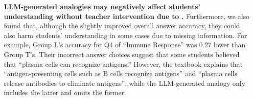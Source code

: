 \textbf{LLM-generated analogies may negatively affect students' understanding without teacher intervention due to .}
Furthermore, we also found that, although the  slightly improved overall answer accuracy, they could also harm students' understanding in some cases due to missing information.
For example, Group L's accuracy for Q4 of ``Immune Response'' was 0.27 lower than Group T's.
Their incorrect answer choices suggest that some students believed that ``plasma cells can recognize antigens.''
However, the textbook explains that ``antigen-presenting cells such as B cells recognize antigens'' and ``plasma cells release antibodies to eliminate antigens'', while the LLM-generated analogy only includes the latter and omits the former.




